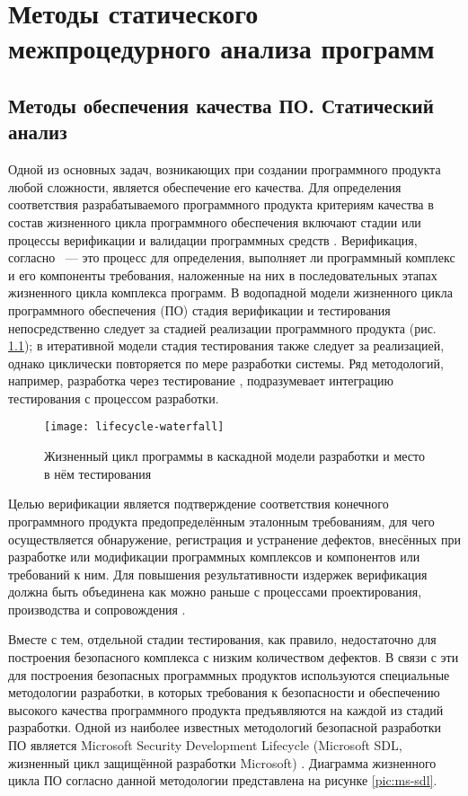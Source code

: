 \chapter{Методы статического межпроцедурного анализа программ} \label{chapt1}


\section{Методы обеспечения качества ПО. Статический анализ}

Одной из основных задач, возникающих при создании программного продукта любой сложности, является обеспечение его качества. Для определения соответствия разрабатываемого программного продукта критериям качества в состав жизненного цикла программного обеспечения включают стадии или процессы верификации и валидации программных средств \cite{gost-12207, gost-34.601}. Верификация, согласно \cite{lipaev-zakaz}~--- это процесс для определения, выполняет ли программный комплекс и его компоненты требования, наложенные на них в последовательных этапах жизненного цикла комплекса программ. В водопадной модели жизненного цикла программного обеспечения (ПО) стадия верификации и тестирования непосредственно следует за стадией реализации программного продукта \cite{waterfall} (рис. \ref{pic:lifecycle-waterfall}); в итеративной модели стадия тестирования также следует за реализацией, однако циклически повторяется по мере разработки системы. Ряд методологий, например, разработка через тестирование \cite{tdd}, подразумевает интеграцию тестирования с процессом разработки. 

\begin{figure}[h]
   \centering
   \texttt{[image: lifecycle-waterfall]}
   \caption{Жизненный цикл программы в каскадной модели разработки и место в нём тестирования}\label{pic:lifecycle-waterfall}
\end{figure}

Целью верификации является подтверждение соответствия конечного программного продукта предопределённым эталонным требованиям, для чего осуществляется обнаружение, регистрация и устранение дефектов, внесённых при разработке или модификации программных комплексов и компонентов или требований к ним. Для повышения результативности издержек верификация должна быть объединена как можно раньше с процессами проектирования, производства и сопровождения \cite{lipaev-zakaz}.

Вместе с тем, отдельной стадии тестирования, как правило, недостаточно для построения безопасного комплекса с низким количеством дефектов. В связи с эти для построения безопасных программных продуктов используются специальные методологии разработки, в которых требования к безопасности и обеспечению высокого качества программного продукта предъявляются на каждой из стадий разработки. Одной из наиболее известных методологий безопасной разработки ПО является Microsoft Security Development Lifecycle (Microsoft SDL, жизненный цикл защищённой разработки Microsoft) \cite{ms-sdl}. Диаграмма жизненного цикла ПО согласно данной методологии представлена на рисунке \ref{pic:ms-sdl}. 

